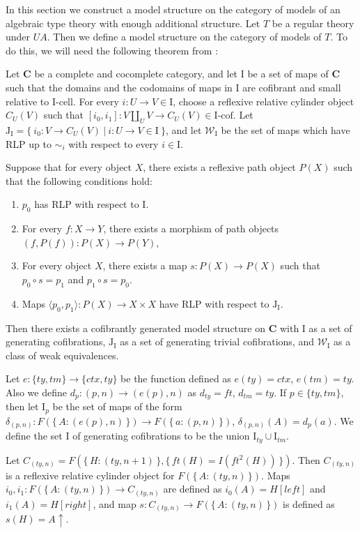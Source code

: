 \documentclass[reqno]{amsart}
\theoremstyle{definition}
\theoremstyle{remark}
\newcommand{\cat}[1]{\mathbf{#1}}
\newcommand{\C}{\cat{C}}
\newcommand{\we}{\mathcal{W}}
\newcommand{\I}{\mathrm{I}}
\newcommand{\J}{\mathrm{J}}
\newcommand{\class}[2]{#1\text{-}\mathrm{#2}}
\newcommand{\Icell}[1][\I]{\class{#1}{cell}}
\newcommand{\Icof}[1][\I]{\class{#1}{cof}}
\newcommand{\cyli}{i}
\numberwithin{figure}{section}
\begin{document}
In this section we construct a model structure on the category of models of an algebraic type theory with enough additional structure.
Let $T$ be a regular theory under $UA$.
Then we define a model structure on the category of models of $T$.
To do this, we will need the following theorem from \cite{f-model-structures}:
\begin{thm}
Let $\C$ be a complete and cocomplete category, and let $\I$ be a set of maps of $\C$
such that the domains and the codomains of maps in $\I$ are cofibrant and small relative to $\Icell$.
For every $i : U \to V \in \I$, choose a reflexive relative cylinder object $C_U(V)$
such that $[\cyli_0,\cyli_1] : V \amalg_U V \to C_U(V) \in \Icof$.
Let $\J_\I = \{\ \cyli_0 : V \to C_U(V)\ |\ i : U \to V \in \I \ \}$, and
let $\we_\I$ be the set of maps which have RLP up to $\sim_i$ with respect to every $i \in \I$.

Suppose that for every object $X$, there exists a reflexive path object $P(X)$ such that the following conditions hold:
\begin{enumerate}
\item $p_0$ has RLP with respect to $\I$.
\item For every $f : X \to Y$, there exists a morphism of path objects $(f,P(f)) : P(X) \to P(Y)$,
\item For every object $X$, there exists a map $s : P(X) \to P(X)$ such that $p_0 \circ s = p_1$ and $p_1 \circ s = p_0$.
\item Maps $\langle p_0, p_1 \rangle : P(X) \to X \times X$ have RLP with respect to $\J_\I$.
\end{enumerate}
Then there exists a cofibrantly generated model structure on $\C$ with $\I$ as a set of generating cofibrations,
$\J_\I$ as a set of generating trivial cofibrations, and $\we_\I$ as a class of weak equivalences.
\end{thm}

Let $e : \{ ty, tm \} \to \{ ctx, ty \}$ be the function defined as $e(ty) = ctx$, $e(tm) = ty$.
Also we define $d_p : (p,n) \to (e(p),n)$ as $d_{ty} = ft$, $d_{tm} = ty$.
If $p \in \{ ty, tm \}$, then let $\I_p$ be the set of maps of the form $\delta_{(p,n)} : F(\{\,A : (e(p),n)\,\}) \to F(\{\,a : (p,n)\,\})$, $\delta_{(p,n)}(A) = d_p(a)$.
We define the set $\I$ of generating cofibrations to be the union $\I_{ty} \cup \I_{tm}$.

Let $C_{(ty,n)} = F(\{\,H : (ty,n+1)\,\}, \{\,ft(H) = I(ft^2(H))\,\})$.
Then $C_{(ty,n)}$ is a reflexive relative cylinder object for $F(\{\,A : (ty,n)\,\})$.
Maps $\cyli_0, \cyli_1 : F(\{\,A : (ty,n)\,\}) \to C_{(ty,n)}$ are defined as $\cyli_0(A) = H[left]$ and $\cyli_1(A) = H[right]$,
and map $s : C_{(ty,n)} \to F(\{\,A : (ty,n)\,\})$ is defined as $s(H) = A\!\!\uparrow$.
\end{document}
